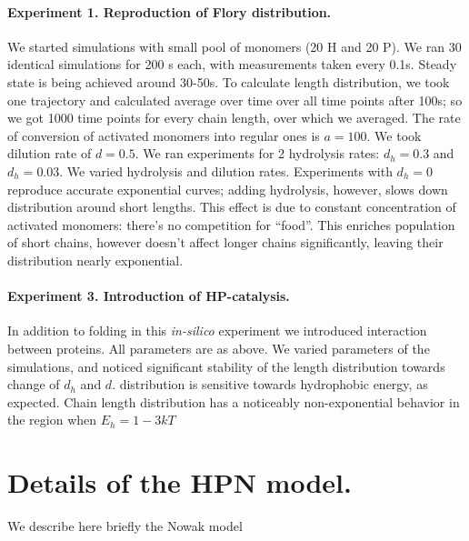 \documentclass[journal=jacsat,manuscript=article,layout=twocolumn]{achemso}
\begin{document}
\paragraph{Experiment 1. Reproduction of Flory distribution.}
We started simulations with small pool of monomers (20 H and 20 P). We ran 30 identical  
simulations for 200 s each, with measurements taken every 0.1s. Steady state is being achieved 
around 30-50s. To calculate length distribution, we took one trajectory and calculated average 
over time over all time points after 100s; so we got 1000 time points for every chain length, over 
which we averaged. The rate of conversion of activated monomers into regular ones is $a=100$. We 
took dilution rate of $d=0.5$. We ran experiments for 2 hydrolysis rates: $d_h=0.3$ and $d_h=0.03$.
We varied hydrolysis and dilution rates. Experiments with $d_h=0$ reproduce accurate exponential 
curves; adding hydrolysis, however, slows down distribution around short lengths. This effect is 
due to constant concentration of activated monomers: there's no competition for ``food''. This 
enriches population of short chains, however doesn't affect longer chains significantly, leaving 
their distribution nearly exponential.





\paragraph{Experiment 3. Introduction of HP-catalysis.}
In addition to folding in this \textit{in-silico} experiment we introduced interaction between 
proteins. All parameters are as above. We varied parameters of the simulations, and noticed 
significant stability of the length distribution towards change of $d_h$ and $d$. distribution is 
sensitive towards hydrophobic energy, as expected. Chain length distribution has a noticeably 
non-exponential behavior in the region when $E_h= 1-3 kT$



 \newpage
\appendix


\section{Details of the HPN model.}

We describe here briefly the Nowak model \cite{nowak2008prevolutionary,Ohtsuki2009,Chen2012}

\end{document}
